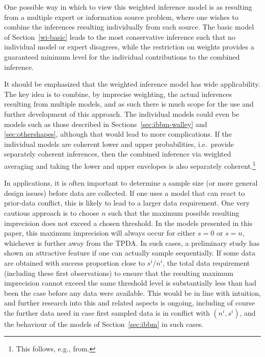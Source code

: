 One possible way in which to view this weighted inference model is
as resulting from a multiple expert or information source problem,
where one wishes to combine the inferences resulting individually
from each source. The basic model of Section~\ref{wi-basic} leads to
the most conservative inference such that no individual model or
expert disagrees, while the restriction on weights provides a
guaranteed minimum level for the individual contributions to the combined
inference.

It should be emphasized that the weighted inference model has wide applicability. The key idea is to combine,
by imprecise weighting, the actual inferences resulting from
multiple models, and as such there is much scope for the use and
further development of this approach. The individual models could
even be models such as those described in
Sections~\ref{sec:ibbm-walley} and \ref{sec:othershapes}, although
that would lead to more complications. If the individual models
are coherent lower and upper probabilities, i.e.\ provide separately
coherent inferences, then the combined inference via weighted
averaging and taking the lower and upper envelopes is also
separately coherent.\footnote{This follows, e.g., from\textcite[\S 2.6.3f]{1991:walley}.}

In applications, it is often important to determine a sample size
(or more general design issues) before data are collected. If one
uses a model that can react to prior-data conflict, this is likely
to lead to a larger data requirement. One very cautious approach is to choose $n$ such that the maximum possible resulting
imprecision does not exceed a chosen threshold. In the models
presented in this paper, this maximum imprecision will always occur
for either $s=0$ or $s=n$, whichever is further away from the TPDA.
In such cases, a preliminary study has shown an attractive feature if one can actually
sample sequentially. If some data are obtained with success proportion close to $s^i/n^i$, %
the total data requirement (including these first observations) %
to ensure that the resulting maximum
imprecision cannot exceed the same threshold level is substantially less
than had been the case before any data were available.
This would be in line with intuition, and further
research into this and related aspects is ongoing, including of
course the further data need in case first sampled data is in
conflict with $(n^i,s^i)$, and the behaviour of the models of Section~\ref{sec:ibbm} in such cases.


